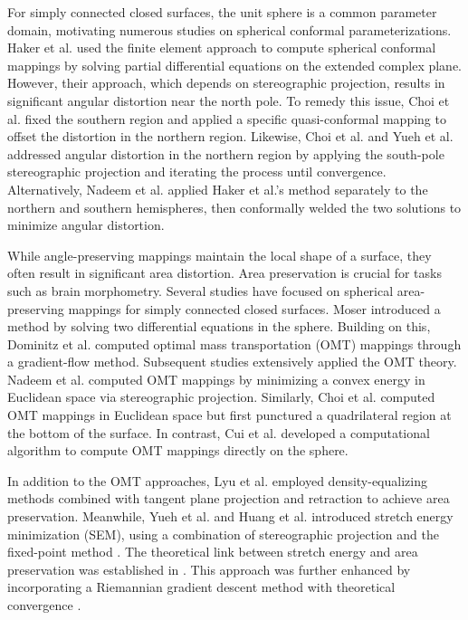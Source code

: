 \documentclass{article}
\numberwithin{equation}{section}
\begin{document}
For simply connected closed surfaces, the unit sphere is a common parameter domain, motivating numerous studies on spherical conformal parameterizations. Haker et al. \cite{AnSH99, AnHT99, HaAT00} used the finite element approach to compute spherical conformal mappings by solving partial differential equations on the extended complex plane. However, their approach, which depends on stereographic projection, results in significant angular distortion near the north pole. To remedy this issue, Choi et al. \cite{ChLL15} fixed the southern region and applied a specific quasi-conformal mapping to offset the distortion in the northern region. Likewise, Choi et al. \cite{ChHo16} and Yueh et al. \cite{YuLL19, LiHL23} addressed angular distortion in the northern region by applying the south-pole stereographic projection and iterating the process until convergence. Alternatively, Nadeem et al. \cite{NaSZ17} applied Haker et al.’s method separately to the northern and southern hemispheres, then conformally welded the two solutions to minimize angular distortion.

While angle-preserving mappings maintain the local shape of a surface, they often result in significant area distortion. Area preservation is crucial for tasks such as brain morphometry. Several studies have focused on spherical area-preserving mappings for simply connected closed surfaces. Moser \cite{Mose65} introduced a method by solving two differential equations in the sphere. Building on this, Dominitz et al. \cite{DoTa10} computed optimal mass transportation (OMT) mappings through a gradient-flow method. Subsequent studies extensively applied the OMT theory. Nadeem et al. \cite{NaSZ17} computed OMT mappings by minimizing a convex energy in Euclidean space via stereographic projection. Similarly, Choi et al. \cite{ChGK22} computed OMT mappings in Euclidean space but first punctured a quadrilateral region at the bottom of the surface. In contrast, Cui et al. \cite{CuQW19} developed a computational algorithm to compute OMT mappings directly on the sphere. 

In addition to the OMT approaches, Lyu et al. \cite{LyCh24} employed density-equalizing methods combined with tangent plane projection and retraction to achieve area preservation. Meanwhile, Yueh et al. \cite{YuLL19} and Huang et al. \cite{HuLW24} introduced stretch energy minimization (SEM), using a combination of stereographic projection and the fixed-point method \cite{YuLW19}. The theoretical link between stretch energy and area preservation was established in \cite{Yueh23}. This approach was further enhanced by incorporating a Riemannian gradient descent method with theoretical convergence \cite{SuYu24}.
\end{document}
